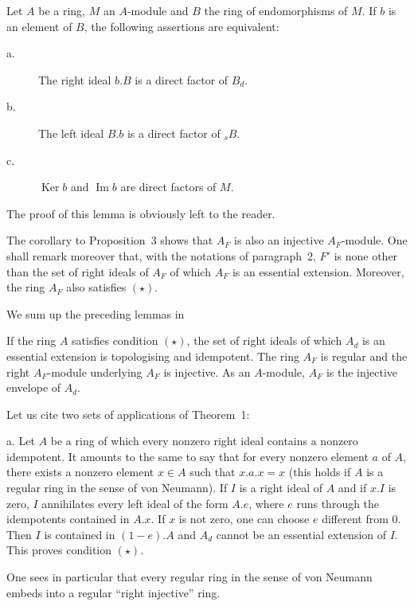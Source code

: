 \begin{lemma}
Let $A$ be a ring, $M$ an $A$-module and $B$ the ring of endomorphisms
of $M$. If $b$ is an element of $B$, the following assertions are
equivalent:
\begin{description}
\item[\normalfont a.] The right ideal $b.B$ is a direct factor of $B_d$.
\item[\normalfont b.] The left ideal $B.b$ is a direct factor of
${}_{s}B$.
\item[\normalfont c.] $\operatorname{Ker}b$ and $\operatorname{Im}b$ are
direct factors of $M$.
\end{description}
\end{lemma}

The proof of this lemma is obviously left to the reader.

The corollary to Proposition~3 shows that $A_F$ is also an injective
$A_F$-module. One shall remark moreover that, with the notations of
paragraph~2, $F'$ is none other than the set of right ideals of $A_F$
of which $A_F$ is an essential extension. Moreover, the ring $A_F$ also
satisfies $(\star)$.

We sum up the preceding lemmas in

\begin{theorem}
If the ring $A$ satisfies condition $(\star)$, the set of right ideals
of which $A_d$ is an essential extension is topologising and
idempotent. The ring $A_F$ is regular and the right $A_F$-module
underlying $A_F$ is injective. As an $A$-module, $A_F$ is the injective
envelope of $A_d$.
\end{theorem}

Let us cite two sets of applications of Theorem~1:

a. Let $A$ be a ring of which every nonzero right ideal contains a
nonzero idempotent. It amounts to the same to say that for every nonzero
element $a$ of $A$, there exists a nonzero element $x\in A$ such that
$x.a.x=x$ (this holds if $A$ is a regular ring in the sense of von
Neumann). If $I$ is a right ideal of $A$ and if $x.I$ is zero, $I$
annihilates every left ideal of the form $A.e$, where $e$ runs through
the idempotents contained in $A.x$. If $x$ is not zero, one can choose
$e$ different from $0$. Then $I$ is contained in $(1-e).A$ and $A_d$
cannot be an essential extension of $I$. This proves condition $(\star)$.

One sees in particular that every regular ring in the sense of von
Neumann embeds into a regular ``right injective'' ring.


